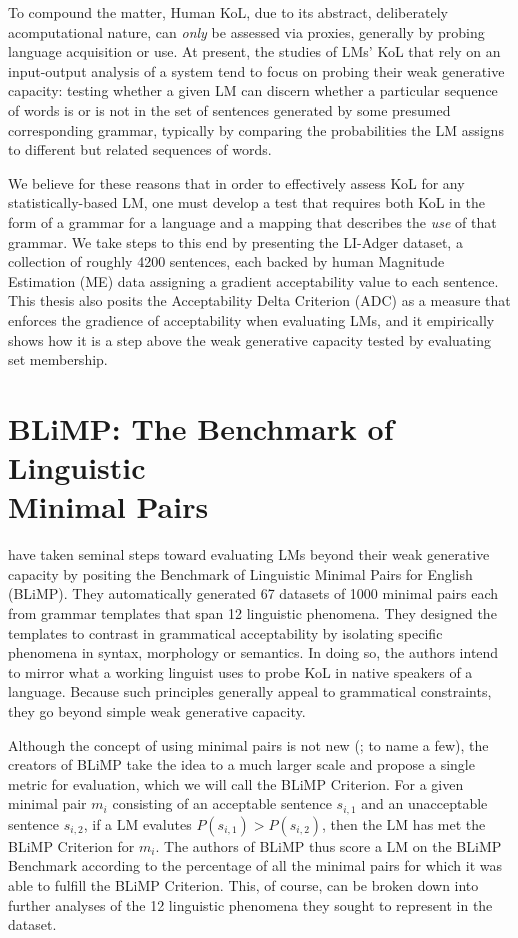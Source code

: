 To compound the matter, Human KoL, due to its abstract, deliberately acomputational nature, can \textit{only} be assessed via proxies, generally by probing language acquisition or use.  At present, the studies of LMs' KoL that rely on an input-output analysis of a system tend to focus on probing their weak generative capacity: testing whether a given LM can discern whether a particular sequence of words is or is not in the set of sentences generated by some presumed corresponding grammar, typically by comparing the probabilities the LM assigns to different but related sequences of words.

We believe for these reasons that in order to effectively assess KoL for any statistically-based LM, one must develop a test that requires both KoL in the form of a grammar for a language and a mapping that describes the \textit{use} of that grammar.  We take steps to this end by presenting the LI-Adger dataset, a collection of roughly 4200 sentences, each backed by human Magnitude Estimation (ME) data assigning a gradient acceptability value to each sentence.  This thesis also posits the Acceptability Delta Criterion (ADC) as a measure that enforces the gradience of acceptability when evaluating LMs, and it empirically shows how it is a step above the weak generative capacity tested by evaluating set membership.

\section{BLiMP: The Benchmark of Linguistic \\Minimal Pairs}
\citet{warstadt2019blimp} have taken seminal steps toward evaluating LMs beyond their weak generative capacity by positing the Benchmark of Linguistic Minimal Pairs for English (BLiMP).  They automatically generated 67 datasets of 1000 minimal pairs each from grammar templates that span 12 linguistic phenomena.  They designed the templates to contrast in grammatical acceptability by isolating specific phenomena in syntax, morphology or semantics.  In doing so, the authors intend to mirror what a working linguist uses to probe KoL in native speakers of a language.  Because such principles generally appeal to grammatical constraints, they go beyond simple weak generative capacity.

Although the concept of using minimal pairs is not new (\citealp{linzen2016assessing,marvin2018targeted,wilcox2018rnn}; to name a few), the creators of BLiMP take the idea to a much larger scale and propose a single metric for evaluation, which we will call the BLiMP Criterion.  For a given minimal pair $m_i$ consisting of an acceptable sentence $s_{i,1}$ and an unacceptable sentence $s_{i,2}$, if a LM evalutes $P(s_{i,1}) > P(s_{i,2})$, then the LM has met the BLiMP Criterion for $m_i$.  The authors of BLiMP thus score a LM on the BLiMP Benchmark according to the percentage of all the minimal pairs for which it was able to fulfill the BLiMP Criterion.  This, of course, can be broken down into further analyses of the 12 linguistic phenomena they sought to represent in the dataset.


